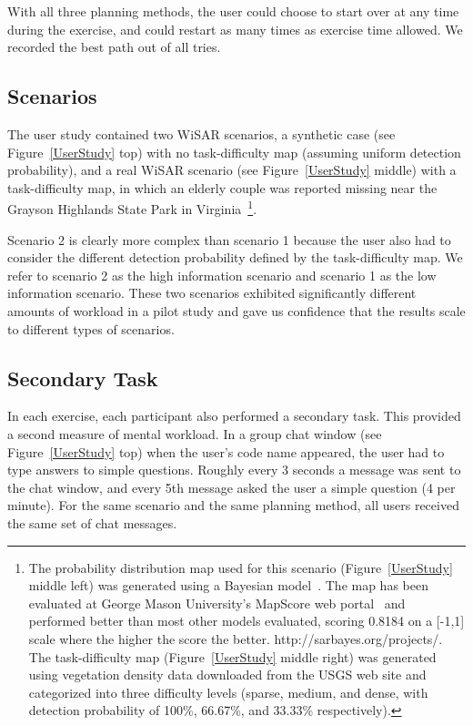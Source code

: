 \documentclass[lettersize, apacite, twoside, HRI]{apa_HRI}
\begin{document}
With all three planning methods, the user could choose to start over at any time during the exercise, and could restart as many times as exercise time allowed. We recorded the best path out of all tries.

\subsection{Scenarios}

The user study contained two WiSAR scenarios, a synthetic case (see Figure~\ref{UserStudy} top) with no task-difficulty map (assuming uniform detection probability), and a real WiSAR scenario (see Figure~\ref{UserStudy} middle) with a task-difficulty map, in which an elderly couple was reported missing near the Grayson Highlands State Park in Virginia~\cite{Koester2008Lost}\footnote{The probability distribution map used for this scenario (Figure~\ref{UserStudy} middle left) was generated using a Bayesian model~\cite{Lin2010Bayesian}. The map has been evaluated at George Mason University's MapScore web portal~\cite{Twardy2012MapScore} and performed better than most other models evaluated, scoring 0.8184 on a [-1,1] scale where the higher the score the better. http://sarbayes.org/projects/. The task-difficulty map (Figure~\ref{UserStudy} middle right) was generated using vegetation density data downloaded from the USGS web site and categorized into three difficulty levels (sparse, medium, and dense, with detection probability of 100\%, 66.67\%, and 33.33\% respectively).}.

Scenario 2 is clearly more complex than scenario 1 because the user also had to consider the different detection probability defined by the task-difficulty map. We refer to scenario 2 as the high information scenario and scenario 1 as the low information scenario. These two scenarios exhibited significantly different amounts of workload in a pilot study and gave us confidence that the results scale to different types of scenarios.

\subsection{Secondary Task}

In each exercise, each participant also performed a secondary task. This provided a second measure of mental workload. In a group chat window (see Figure~\ref{UserStudy} top) when the user's code name appeared, the user had to type answers to simple questions. Roughly every 3 seconds a message was sent to the chat window, and every 5th message asked the user a simple question (4 per minute). For the same scenario and the same planning method, all users received the same set of chat messages.
\end{document}
